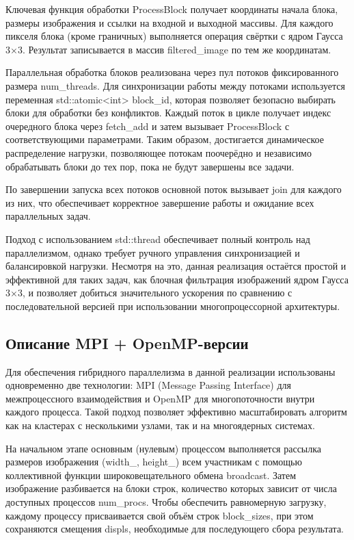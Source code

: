 \documentclass[14pt, a4paper]{extarticle}
\newcommand{\code}[1]{{\ttfamily\fontsize{14pt}{16pt}\selectfont #1}}
\begin{document}
Ключевая функция обработки \code{ProcessBlock} получает координаты начала блока, размеры изображения и ссылки на входной и выходной массивы. Для каждого пикселя блока (кроме граничных) выполняется операция свёртки с ядром Гаусса 3×3. Результат записывается в массив  \code{filtered\_image} по тем же координатам.

Параллельная обработка блоков реализована через пул потоков фиксированного размера  \code{num\_threads}. Для синхронизации работы между потоками используется переменная  \code{std::atomic<int> block\_id}, которая позволяет безопасно выбирать блоки для обработки без конфликтов. Каждый поток в цикле получает индекс очередного блока через  \code{fetch\_add} и затем вызывает  \code{ProcessBlock} с соответствующими параметрами. Таким образом, достигается динамическое распределение нагрузки, позволяющее потокам поочерёдно и независимо обрабатывать блоки до тех пор, пока не будут завершены все задачи.

По завершении запуска всех потоков основной поток вызывает  \code{join} для каждого из них, что обеспечивает корректное завершение работы и ожидание всех параллельных задач.

Подход с использованием std::thread обеспечивает полный контроль над параллелизмом, однако требует ручного управления синхронизацией и балансировкой нагрузки. Несмотря на это, данная реализация остаётся простой и эффективной для таких задач, как блочная фильтрация изображений ядром Гаусса 3×3, и позволяет добиться значительного ускорения по сравнению с последовательной версией при использовании многопроцессорной архитектуры.


\subsection{Описание MPI + OpenMP-версии}
Для обеспечения гибридного параллелизма в данной реализации использованы одновременно две технологии: MPI (Message Passing Interface) для межпроцессного взаимодействия и OpenMP для многопоточности внутри каждого процесса. Такой подход позволяет эффективно масштабировать алгоритм как на кластерах с несколькими узлами, так и на многоядерных системах.

На начальном этапе основным (нулевым) процессом выполняется рассылка размеров изображения (\code{width\_}, \code{height\_}) всем участникам с помощью коллективной функции широковещательного обмена \code{broadcast}. Затем изображение разбивается на блоки строк, количество которых зависит от числа доступных процессов \code{num\_procs}. Чтобы обеспечить равномерную загрузку, каждому процессу присваивается свой объём строк \code{block\_sizes}, при этом сохраняются смещения \code{displs}, необходимые для последующего сбора результата.
\end{document}
